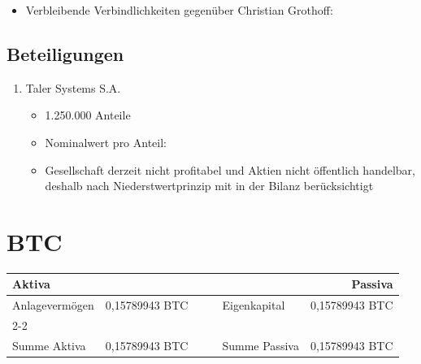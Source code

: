 \documentclass[german,a4paper]{article} %
\begin{document}
\begin{itemize}
  \item Verbleibende Verbindlichkeiten gegenüber Christian Grothoff: 
\end{itemize}

\subsection{Beteiligungen}

\begin{enumerate}
  \item Taler Systems S.A.
    \begin{itemize}
      \item 1.250.000 Anteile
      \item Nominalwert pro Anteil: 
      \item Gesellschaft derzeit nicht profitabel und Aktien nicht
        öffentlich handelbar, deshalb nach Niederstwertprinzip mit 
        in der Bilanz ber\"ucksichtigt
    \end{itemize}
\end{enumerate}

\section{BTC}

\begin{tabular}{lrc|clr}
\multicolumn{2}{l}{Aktiva} &&&  %
\multicolumn{2}{r}{Passiva} \\  %
\hline
Anlageverm\"ogen     & 0,15789943 BTC &&&  Eigenkapital    & 0,15789943 BTC \\[1ex]
\cline{2-2}\cline{6-6}&&& \\[-2ex]
Summe Aktiva & 0,15789943 BTC    &&& Summe Passiva  & 0,15789943 BTC
\end{tabular}
\end{document}
